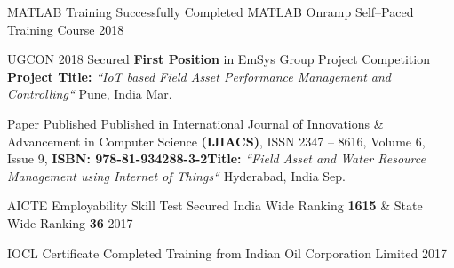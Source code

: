 \vspace{-10pt}
\vspace{1pt}

\begin{cvhonors}


\cvhonor
{MATLAB Training} %
{Successfully Completed MATLAB Onramp Self--Paced Training Course\vspace{5pt}} %
{} %
{\vspace{5pt}2018} %


\cvhonor
{UGCON 2018} %
{Secured \textbf{First Position} in EmSys Group Project Competition \newline \textbf{Project Title:} \textit{``IoT based Field Asset Performance Management and Controlling\vspace{5pt}``} } %
{Pune, India} %
{Mar. } %


\cvhonor
{Paper Published} %
{Published in International Journal of Innovations \& Advancement in Computer Science \textbf{(IJIACS)}, ISSN 2347 -- 8616, Volume 6, Issue 9, \textbf{ISBN: 978-81-934288-3-2}\newline\textbf{Title:} \textit{``Field Asset and Water Resource Management using Internet of Things``} \vspace{5pt}} %
{Hyderabad, India} %
{Sep. } %


\cvhonor
{AICTE Employability Skill Test} %
{Secured India Wide Ranking \textbf{1615} \& State Wide Ranking \textbf{36} \vspace{5pt}} %
{} %
{\vspace{5pt}2017} %


\cvhonor
{IOCL Certificate} %
{Completed Training from Indian Oil Corporation Limited \vspace{5pt}} %
{} %
{\vspace{5pt}2017} %


\end{cvhonors}
